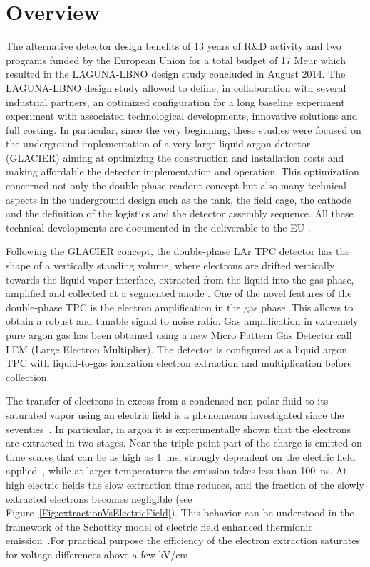 \section{Overview}
\label{sec:detectors-fd-ref-ov}


The alternative detector design benefits of 13 years of R\&D activity and two programs funded by the European Union for a total budget of 17 Meur which resulted in the LAGUNA-LBNO design study concluded in August 2014. The LAGUNA-LBNO design study allowed to define, in collaboration with several industrial partners, an optimized configuration for a long baseline experiment  experiment with associated technological developments, innovative solutions and full costing. In particular, since the very beginning, these studies were focused on the underground implementation of a very large liquid argon detector (GLACIER) aiming at optimizing the construction and installation costs and making affordable the detector implementation and operation. This optimization concerned not only the double-phase readout concept but also many technical aspects in the underground design such as the tank, the field cage, the cathode  and the definition of the logistics and the detector assembly sequence. All these technical developments are documented in the deliverable to the EU \cite{LAGUNA-LBNO-deliv}.

Following the GLACIER concept, the double-phase LAr TPC detector has the shape of a vertically standing volume, where electrons are drifted vertically towards the liquid-vapor interface, extracted from the liquid into the gas phase, amplified and collected at a segmented anode \cite{Badertscher:2013wm,Badertscher:2012dq,Badertscher:2010zg}. One of the novel features of the double-phase TPC is the electron amplification in the gas phase. This allows to obtain a robust and tunable signal to noise ratio. Gas amplification in extremely pure argon gas has been obtained using a new Micro Pattern Gas Detector call LEM (Large Electron Multiplier). The detector is configured as a liquid argon TPC with liquid-to-gas ionization electron extraction and multiplication before collection.

The transfer of electrons in excess from a condensed non-polar fluid to its saturated vapor using an electric field is a phenomenon investigated since the seventies~\cite{Dolgoshein1970}. In particular, in argon it is experimentally shown that the electrons are extracted in two stages. Near the triple point part of the charge is emitted on time scales that can be as high as 1~ms, strongly dependent on the electric field applied~\cite{Gushchin1982b, Borghesani1990}, while at larger temperatures the emission takes less than 100~ns. At high electric fields the slow extraction time reduces, and the fraction of the slowly extracted electrons becomes negligible (see Figure~\ref{Fig:extractionVsElectricField}). This behavior can be understood in the framework of the Schottky model of electric field enhanced thermionic emission~\cite{Murphy1956}.For practical purpose the efficiency of the electron extraction saturates for voltage differences above a few kV/cm

